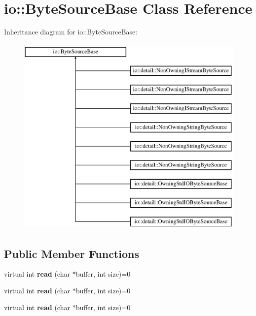\hypertarget{classio_1_1_byte_source_base}{}\section{io\+:\+:Byte\+Source\+Base Class Reference}
\label{classio_1_1_byte_source_base}
Inheritance diagram for io\+:\+:Byte\+Source\+Base\+:\begin{figure}[H]
\begin{center}
\leavevmode
\includegraphics[height=10.000000cm]{db/ddc/classio_1_1_byte_source_base}
\end{center}
\end{figure}
\subsection*{Public Member Functions}
\begin{DoxyCompactItemize}
\item 
\mbox{\label{classio_1_1_byte_source_base_a9598bcc869b79e44da07f0e6fa478615}} 
virtual int {\bfseries read} (char $\ast$buffer, int size)=0
\item 
\mbox{\label{classio_1_1_byte_source_base_a9598bcc869b79e44da07f0e6fa478615}} 
virtual int {\bfseries read} (char $\ast$buffer, int size)=0
\item 
\mbox{\label{classio_1_1_byte_source_base_a9598bcc869b79e44da07f0e6fa478615}} 
virtual int {\bfseries read} (char $\ast$buffer, int size)=0
\end{DoxyCompactItemize}


